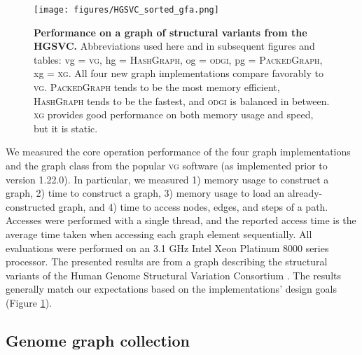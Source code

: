 \documentclass{bioinfo}
\begin{document}
\begin{figure}
	\begin{center}
		\texttt{[image: figures/HGSVC\_sorted\_gfa.png]}
	\end{center}
	\caption{{\label{fig:hgsvc}
        \textbf{Performance on a graph of structural variants from the HGSVC.}
        Abbreviations used here and in subsequent figures and tables: vg = \textsc{vg}, hg = \textsc{HashGraph}, og = \textsc{odgi}, pg = \textsc{PackedGraph}, xg = \textsc{xg}.
        All four new graph implementations compare favorably to \textsc{vg}.
        \textsc{PackedGraph} tends to be the most memory efficient, \textsc{HashGraph} tends to be the fastest, and \textsc{odgi} is balanced in between.
        \textsc{xg} provides good performance on both memory usage and speed, but it is static.
        }
      }
\end{figure}

We measured the core operation performance of the four graph implementations and the graph class from the popular \textsc{vg} software (as implemented prior to version 1.22.0).
In particular, we measured 1) memory usage to construct a graph, 2) time to construct a graph, 3) memory usage to load an already-constructed graph, and 4) time to access nodes, edges, and steps of a path.
Accesses were performed with a single thread, and the reported access time is the average time taken when accessing each graph element sequentially.
All evaluations were performed on an 3.1 GHz Intel Xeon Platinum 8000 series processor.
The presented results are from a graph describing the structural variants of the Human Genome Structural Variation Consortium \citep{chaisson2019multi}.
The results generally match our expectations based on the implementations' design goals (Figure \ref{fig:hgsvc}).

\subsection{Genome graph collection}
\end{document}
